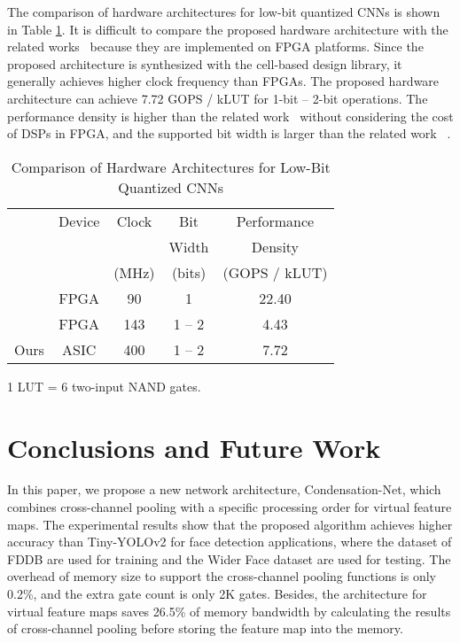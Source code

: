 \documentclass[10pt,twocolumn,letterpaper]{article}
\begin{document}
The comparison of hardware architectures for low-bit quantized CNNs is shown in Table \ref{tab:related}. It is difficult to compare the proposed hardware architecture with the related works~\cite{li17,zhao17} because they are implemented on FPGA platforms. Since the proposed architecture is synthesized with the cell-based design library, it generally achieves higher clock frequency than FPGAs. The proposed hardware architecture can achieve 7.72 GOPS / kLUT for 1-bit -- 2-bit operations. The performance density is higher than the related work~\cite{zhao17} without considering the cost of DSPs in FPGA, and the supported bit width is larger than the related work ~\cite{li17}.

\begin{table}
\begin{center}
\begin{tabular}{l|cccc}
\hline
               & Device          &  Clock & Bit        & Performance \\
               &                 &        & Width      & Density\\
               &                 &  (MHz) & (bits)      & (GOPS / kLUT)\\
\hline\hline
~\cite{li17}   & FPGA           & 90    & 1               & 22.40\\
~\cite{zhao17} & FPGA           & 143   & 1 -- 2          & 4.43 \\
Ours           & ASIC           & 400   & 1 -- 2          & 7.72\\
\hline
\end{tabular}
\end{center}
{\small
1 LUT = 6 two-input NAND gates.\\
}
\caption{Comparison of Hardware Architectures for Low-Bit Quantized CNNs}
\label{tab:related}
\end{table}






\section{Conclusions and Future Work}
\label{sec:conclusion}

In this paper, we propose a new network architecture, Condensation-Net, which combines cross-channel pooling with a specific processing order for virtual feature maps. The experimental results show that the proposed algorithm achieves higher accuracy than Tiny-YOLOv2 for face detection applications, where the dataset of FDDB are used for training and the Wider Face dataset are used for testing. The overhead of memory size to support the cross-channel pooling functions is only 0.2\%, and the extra gate count is only 2K gates. Besides, the architecture for virtual feature maps saves 26.5\% of memory bandwidth by calculating the results of cross-channel pooling before storing the feature map into the memory.
\end{document}
